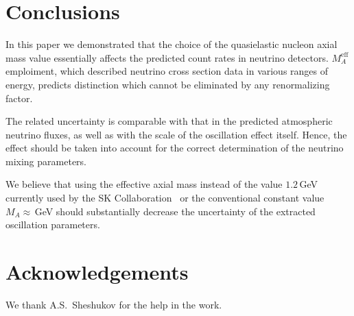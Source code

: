 \section{Conclusions}
In this paper we demonstrated that the choice of the quasielastic nucleon axial mass value essentially affects the predicted count rates in neutrino detectors. $M_{A}^{\mathrm{eff}}$ emploiment, which described neutrino cross section data in various ranges of energy, predicts distinction which cannot be eliminated by any renormalizing factor.

The related uncertainty is comparable with that in the predicted atmospheric neutrino fluxes, as well as with the scale of the oscillation effect itself. Hence, the effect should be taken into account for the correct determination of the neutrino mixing parameters. 

We believe that using the effective axial mass instead of the value $1.2$\,GeV currently used by the SK Collaboration~\cite{Wendell:2010md} or the conventional constant value $M_{A}\approx$\,GeV should substantially decrease the uncertainty of the extracted oscillation parameters.

\section*{Acknowledgements}
We thank A.\/S.~Sheshukov for the help in the work.
